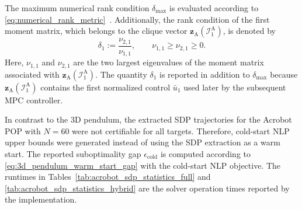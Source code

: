 The maximum numerical rank condition $\delta_{\max}$ is evaluated according to
\eqref{eq:numerical_rank_metric}~\cite{Sangli2025}. Additionally, the rank condition
of the first moment matrix, which belongs to the
clique vector \(\bm{z}_{\mathrm{A}}(\mathcal I_1^{\mathrm{A}})\), is denoted by
\begin{equation}
    \delta_1
    :=
    \frac{\nu_{2,1}}{\nu_{1,1}},
    \qquad
    \nu_{1,1}\geq\nu_{2,1}\geq0.
    \label{eq:acrobot_first_clique_rank_metric}
\end{equation}
Here, $\nu_{1,1}$ and $\nu_{2,1}$ are the two largest eigenvalues of
the moment matrix associated with
\(\bm{z}_{\mathrm{A}}(\mathcal I_1^{\mathrm{A}})\). The quantity
\(\delta_1\) is reported in addition to \(\delta_{\max}\) because
\(\bm{z}_{\mathrm{A}}(\mathcal I_1^{\mathrm{A}})\) contains the first normalized control
$\bar u_1$ used later by the subsequent MPC controller.

In contrast to the $3$D pendulum, the extracted SDP trajectories for the
Acrobot POP with $N=60$ were not certifiable for all targets. Therefore,
cold-start NLP upper bounds were generated instead of using the SDP extraction
as a warm start. The reported suboptimality gap
$\epsilon_{\mathrm{cold}}$ is computed according to
\eqref{eq:3d_pendulum_warm_start_gap} with the cold-start NLP objective. The
runtimes in Tables~\ref{tab:acrobot_sdp_statistics_full} and
\ref{tab:acrobot_sdp_statistics_hybrid} are the solver operation times reported
by the implementation.

